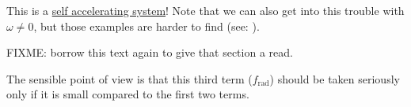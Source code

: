 This is a \underline{self accelerating system}!  Note that we can also get into this trouble with $\omega \ne 0$, but those examples are harder to find (see: \cite{griffith1981introduction}).

FIXME: borrow this text again to give that section a read.

The sensible point of view is that this third term ($f_{\text{rad}}$) should be taken seriously only if it is small compared to the first two terms.

%

\EndArticle
